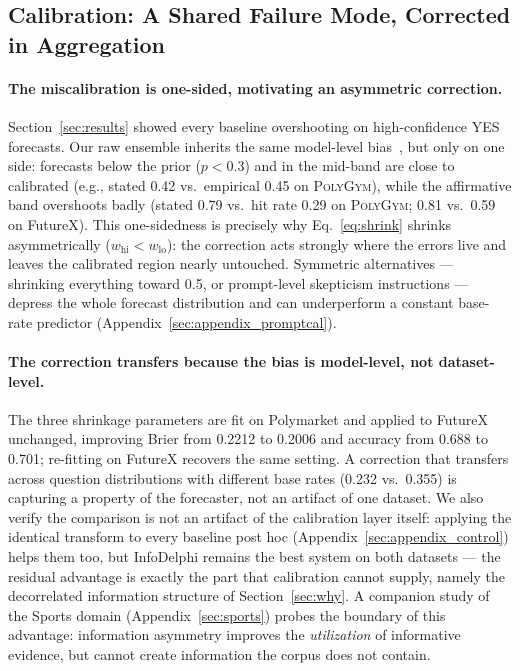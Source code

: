 \subsection{Calibration: A Shared Failure Mode, Corrected in Aggregation}
\label{sec:calibration_study}

\paragraph{ The miscalibration is one-sided, motivating an asymmetric correction.}
Section~\ref{sec:results} showed every baseline overshooting on high-confidence YES forecasts.
Our raw ensemble inherits the same model-level bias~\citep{tian2023just}, but only on one side: forecasts below the prior ($p < 0.3$) and in the mid-band are close to calibrated (e.g., stated 0.42 vs.\ empirical 0.45 on \textsc{PolyGym}), while the affirmative band overshoots badly (stated 0.79 vs.\ hit rate 0.29 on \textsc{PolyGym}; 0.81 vs.\ 0.59 on FutureX).
This one-sidedness is precisely why Eq.~\eqref{eq:shrink} shrinks asymmetrically ($w_{\mathrm{hi}} < w_{\mathrm{lo}}$): the correction acts strongly where the errors live and leaves the calibrated region nearly untouched.
Symmetric alternatives --- shrinking everything toward 0.5, or prompt-level skepticism instructions --- depress the whole forecast distribution and can underperform a constant base-rate predictor (Appendix~\ref{sec:appendix_promptcal}).

\paragraph{ The correction transfers because the bias is model-level, not dataset-level.}
The three shrinkage parameters are fit on Polymarket and applied to FutureX unchanged, improving Brier from 0.2212 to 0.2006 and accuracy from 0.688 to 0.701; re-fitting on FutureX recovers the same setting.
A correction that transfers across question distributions with different base rates (0.232 vs.\ 0.355) is capturing a property of the forecaster, not an artifact of one dataset.
We also verify the comparison is not an artifact of the calibration layer itself: applying the identical transform to every baseline post hoc (Appendix~\ref{sec:appendix_control}) helps them too, but InfoDelphi remains the best system on both datasets --- the residual advantage is exactly the part that calibration cannot supply, namely the decorrelated information structure of Section~\ref{sec:why}.
A companion study of the Sports domain (Appendix~\ref{sec:sports}) probes the boundary of this advantage: information asymmetry improves the \emph{utilization} of informative evidence, but cannot create information the corpus does not contain.
